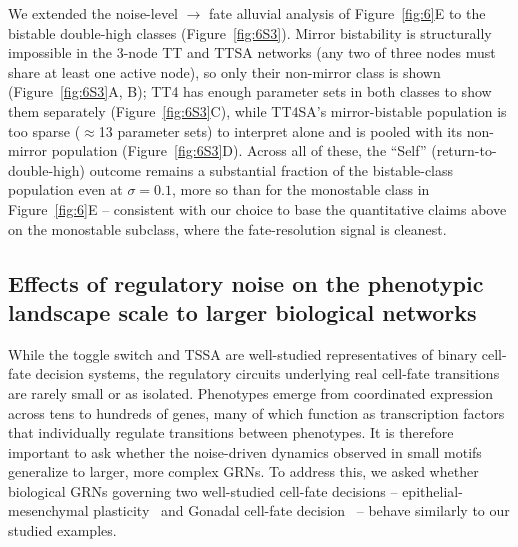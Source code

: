 \documentclass[11pt]{article}
\begin{document}
We extended the noise-level $\to$ fate alluvial analysis of Figure~\ref{fig:6}E to the bistable double-high classes (Figure~\ref{fig:6S3}). Mirror bistability is structurally impossible in the 3-node TT and TTSA networks (any two of three nodes must share at least one active node), so only their non-mirror class is shown (Figure~\ref{fig:6S3}A, B); TT4 has enough parameter sets in both classes to show them separately (Figure~\ref{fig:6S3}C), while TT4SA's mirror-bistable population is too sparse ($\approx$13 parameter sets) to interpret alone and is pooled with its non-mirror population (Figure~\ref{fig:6S3}D). Across all of these, the ``Self'' (return-to-double-high) outcome remains a substantial fraction of the bistable-class population even at $\sigma=0.1$, more so than for the monostable class in Figure~\ref{fig:6}E -- consistent with our choice to base the quantitative claims above on the monostable subclass, where the fate-resolution signal is cleanest.


\subsection{Effects of regulatory noise on the phenotypic landscape scale to larger biological networks}

While the toggle switch and TSSA are well-studied representatives of binary cell-fate decision systems, the regulatory circuits underlying real cell-fate transitions are rarely small or as isolated. Phenotypes emerge from coordinated expression across tens to hundreds of genes, many of which function as transcription factors that individually regulate transitions between phenotypes. It is therefore important to ask whether the noise-driven dynamics observed in small motifs generalize to larger, more complex GRNs. To address this, we asked whether biological GRNs governing two well-studied cell-fate decisions -- epithelial-mesenchymal plasticity~\cite{hari2022landscape} and Gonadal cell-fate decision~\cite{rios2015boolean} -- behave similarly to our studied examples.
\end{document}
